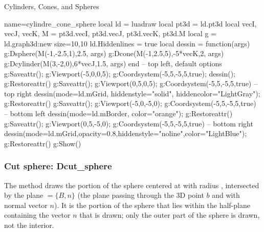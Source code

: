 \begin{demo}{Cylinders, Cones, and Spheres}
\begin{luadraw}{name=cylindre_cone_sphere}
local ld = luadraw
local pt3d = ld.pt3d
local vecI, vecJ, vecK, M = pt3d.vecI, pt3d.vecJ, pt3d.vecK, pt3d.M
local g = ld.graph3d:new{ size={10,10} }
ld.Hiddenlines = true
local dessin = function(args)
    g:Dsphere(M(-1,-2.5,1),2.5, args)
    g:Dcone(M(-1,2.5,5),-5*vecK,2, args)
    g:Dcylinder(M(3,-2,0),6*vecJ,1.5, args)
end
-- top left, default options
g:Saveattr(); g:Viewport(-5,0,0,5); g:Coordsystem(-5,5,-5,5,true); dessin(); g:Restoreattr()
g:Saveattr(); g:Viewport(0,5,0,5); g:Coordsystem(-5,5,-5,5,true) 
-- top right
dessin({mode=ld.mGrid, hiddenstyle="solid", hiddencolor="LightGray"}); g:Restoreattr()
g:Saveattr(); g:Viewport(-5,0,-5,0); g:Coordsystem(-5,5,-5,5,true) 
-- bottom left
dessin({mode=ld.mBorder, color="orange"}); g:Restoreattr()
g:Saveattr(); g:Viewport(0,5,-5,0); g:Coordsystem(-5,5,-5,5,true) 
-- bottom right
dessin({mode=ld.mGrid,opacity=0.8,hiddenstyle="noline",color="LightBlue"}); g:Restoreattr()
g:Show()
\end{luadraw}
\end{demo}


\subsubsection{Cut sphere: Dcut\_sphere}

The method  draws the portion of the sphere centered at  with radius , intersected by the plane $=\{B,n\}$ (the plane passing through the 3D point $b$ and with normal vector $n$). It is the portion of the sphere that lies within the half-plane containing the vector $n$ that is drawn; only the outer part of the sphere is drawn, not the interior.

